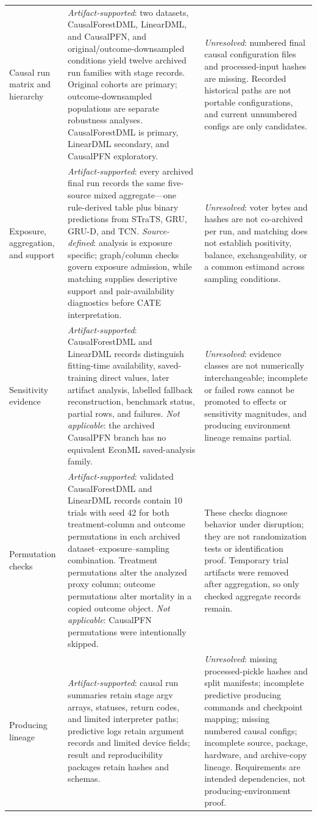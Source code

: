 \begin{longtable}{@{}L{0.19\textwidth}L{0.42\textwidth}L{0.30\textwidth}@{}}
Causal run matrix and hierarchy & \emph{Artifact-supported}: two datasets, CausalForestDML, LinearDML, and CausalPFN, and original/outcome-downsampled conditions yield twelve archived run families with stage records.  Original cohorts are primary; outcome-downsampled populations are separate robustness analyses.  CausalForestDML is primary, LinearDML secondary, and CausalPFN exploratory. & \emph{Unresolved}: numbered final causal configuration files and processed-input hashes are missing.  Recorded historical paths are not portable configurations, and current unnumbered configs are only candidates. \\
Exposure, aggregation, and support & \emph{Artifact-supported}: every archived final run records the same five-source mixed aggregate---one rule-derived table plus binary predictions from STraTS, GRU, GRU-D, and TCN.  \emph{Source-defined}: analysis is exposure specific; graph/column checks govern exposure admission, while matching supplies descriptive support and pair-availability diagnostics before CATE interpretation. & \emph{Unresolved}: voter bytes and hashes are not co-archived per run, and matching does not establish positivity, balance, exchangeability, or a common estimand across sampling conditions. \\
Sensitivity evidence & \emph{Artifact-supported}: CausalForestDML and LinearDML records distinguish fitting-time availability, saved-training direct values, later artifact analysis, labelled fallback reconstruction, benchmark status, partial rows, and failures.  \emph{Not applicable}: the archived CausalPFN branch has no equivalent EconML saved-analysis family. & \emph{Unresolved}: evidence classes are not numerically interchangeable; incomplete or failed rows cannot be promoted to effects or sensitivity magnitudes, and producing environment lineage remains partial. \\
Permutation checks & \emph{Artifact-supported}: validated CausalForestDML and LinearDML records contain 10 trials with seed 42 for both treatment-column and outcome permutations in each archived dataset--exposure--sampling combination.  Treatment permutations alter the analyzed proxy column; outcome permutations alter mortality in a copied outcome object.  \emph{Not applicable}: CausalPFN permutations were intentionally skipped. & These checks diagnose behavior under disruption; they are not randomization tests or identification proof.  Temporary trial artifacts were removed after aggregation, so only checked aggregate records remain. \\
Producing lineage & \emph{Artifact-supported}: causal run summaries retain stage argv arrays, statuses, return codes, and limited interpreter paths; predictive logs retain argument records and limited device fields; result and reproducibility packages retain hashes and schemas. & \emph{Unresolved}: missing processed-pickle hashes and split manifests; incomplete predictive producing commands and checkpoint mapping; missing numbered causal configs; incomplete source, package, hardware, and archive-copy lineage.  Requirements are intended dependencies, not producing-environment proof. \\
\end{longtable}

